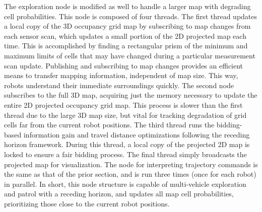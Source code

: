 \documentclass[smallextended]{svjour3}       %
\begin{document}
The exploration node is modified as well to handle a larger map with degrading cell probabilities. This node is composed of four threads. The first thread updates a local copy of the 3D occupancy grid map by subscribing to map changes from each sensor scan, which updates a small portion of the 2D projected map each time. This is accomplished by finding a rectangular prism of the minimum and maximum limits of cells that may have changed during a particular measurement scan update. Publishing and subscribing to map changes provides an efficient means to transfer mapping information, independent of map size. This way, robots understand their immediate surroundings quickly. The second node subscribes to the full 3D map, acquiring just the memory necessary to update the entire 2D projected occupancy grid map. This process is slower than the first thread due to the large 3D map size, but vital for tracking degradation of grid cells far from the current robot positions. The third thread runs the bidding-based information gain and travel distance optimizations following the receding horizon framework. During this thread, a local copy of the projected 2D map is locked to ensure a fair bidding process. The final thread simply broadcasts the projected map for visualization. The node for interpreting trajectory commands is the same as that of the prior section, and is run three times (once for each robot) in parallel. In short, this node structure is capable of multi-vehicle exploration and patrol with a receding horizon, and updates all map cell probabilities, prioritizing those close to the current robot positions.
\end{document}
